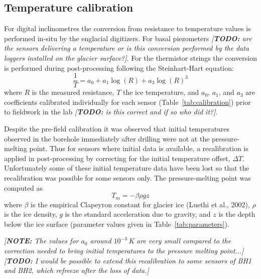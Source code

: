 \documentclass[utf8]{article}
\newcommand{\note}[1]{\textcolor{c0}{\emph{[\textbf{NOTE:} #1]}}}
\newcommand{\todo}[1]{\textcolor{c3}{\emph{[\textbf{TODO:} #1]}}}
\begin{document}
\subsection{Temperature calibration}

    For digital inclinometres the conversion from resistance to temperature
    values is performed in-situ by the englacial digitizers. For basal
    piezometers \todo{are the sensors delivering a temperature or is this
    conversion performed by the data loggers installed on the glacier
    surface?}. For the thermistor strings the conversion is performed during
    post-processing following the Steinhart-Hart equation:
    \begin{equation}
      \frac{1}{T} = a_0 + a_1 \log(R) + a_3 \log(R)^3
    \end{equation}
    where $R$ is the measured resistance, $T$ the ice temperature, and $a_0$,
    $a_1$, and $a_3$ are coefficients calibrated individually for each sensor
    (Table~\ref{tab:calibration}) prior to fieldwork in the lab \todo{is this
    correct and if so who did it?}.

    Despite the pre-field calibration it was observed that initial temperatures
    observed in the borehole immediately after drilling were not at the
    pressure-melting point. Thus for sensors where initial data is available,
    a recalibration is applied in post-processing by correcting for the initial
    temperature offset, $\Delta T$. Unfortunately some of these initial
    temperature data have been lost so that the recalibration was possible for
    some sensors only. The pressure-melting point was computed as
    \begin{equation}
      T_m = -\beta \rho g z
    \end{equation}
    where $\beta$ is the empirical Clapeyron constant for glacier ice
    (Luethi et al., 2002), $\rho$ is the ice density, $g$ is the standard
    acceleration due to gravity, and $z$ is the depth below the ice surface
    (parameter values given in Table~\ref{tab:parameters}).

    \note{The values for $a_0$ around $10^{-3}$\,K are very small compared to
          the correction needed to bring initial temperatures to the pressure
          melting point...}
    \todo{I would be possible to extend this recalibration to some sensors of
          BH1 and BH2, which refreeze after the loss of data.}
\end{document}
